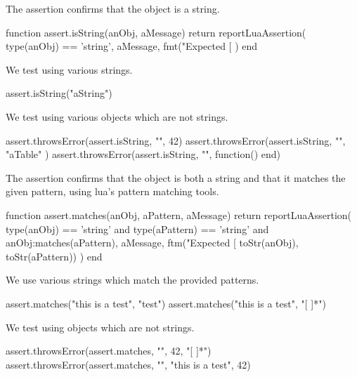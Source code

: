 \stopTestSuite


The  assertion confirms that the object is a string. 

\startLuaCode
function assert.isString(anObj, aMessage)
  return reportLuaAssertion(
    type(anObj) == 'string',
    aMessage,
    fmt("Expected [%
  )
end
\stopLuaCode


We test using various strings.

\startLuaTest
  assert.isString("aString")
\stopLuaTest
\stopTestCase


We test using various objects which are not strings. 

\startLuaTest
  assert.throwsError(assert.isString, "", 42)
  assert.throwsError(assert.isString, "", { "aTable" })
  assert.throwsError(assert.isString, "", function() end)
\stopLuaTest
\stopTestCase

\stopTestSuite


The  assertion confirms that the object is both a 
string and that it matches the given pattern, using lua's pattern matching 
tools. 

\startLuaCode
function assert.matches(anObj, aPattern, aMessage)
  return reportLuaAssertion(
    type(anObj) == 'string' and type(aPattern) == 'string' 
    and anObj:matches(aPattern),
    aMessage,
    ftm("Expected [%
      toStr(anObj), toStr(aPattern))
  )
end
\stopLuaCode


We use various strings which match the provided patterns. 

\startLuaTest
  assert.matches("this is a test", "test")
  assert.matches("this is a test", "[ ]*")
\stopLuaTest
\stopTestCase


We test using objects which are not strings.

\startLuaTest
  assert.throwsError(assert.matches, "", 42, "[ ]*")
  assert.throwsError(assert.matches, "",
    "this is a test", 42)
\stopLuaTest
\stopTestCase

